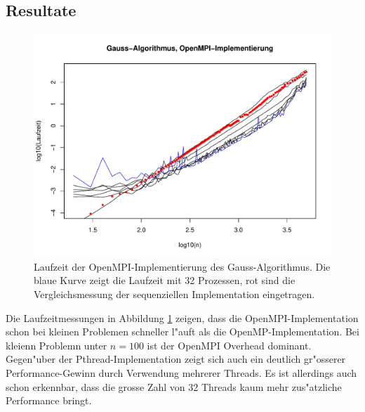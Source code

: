 \subsection{Resultate}
\begin{figure}
\begin{center}
\includegraphics[width=\hsize]{images/gauss-openmpi.pdf}
\end{center}
\caption{Laufzeit der OpenMPI-Implementierung des Gauss-Algorithmus.
Die blaue Kurve zeigt die Laufzeit mit 32 Prozessen, rot sind die
Vergleichsmessung der sequenziellen Implementation eingetragen.
\label{openmpi-performance}}
\end{figure}
Die Laufzeitmessungen in Abbildung \ref{openmpi-performance} zeigen,
dass die OpenMPI-Implementation schon bei kleinen Problemen schneller
l"auft als die OpenMP-Implementation.
Bei kleienn Problemn unter $n=100$ ist der OpenMPI Overhead dominant.
Gegen"uber der Pthread-Implementation zeigt sich auch ein deutlich gr"osserer
Performance-Gewinn durch Verwendung mehrerer Threads.
Es ist allerdings auch schon erkennbar, dass die grosse Zahl von 32 Threads
kaum mehr zus"atzliche Performance bringt.

